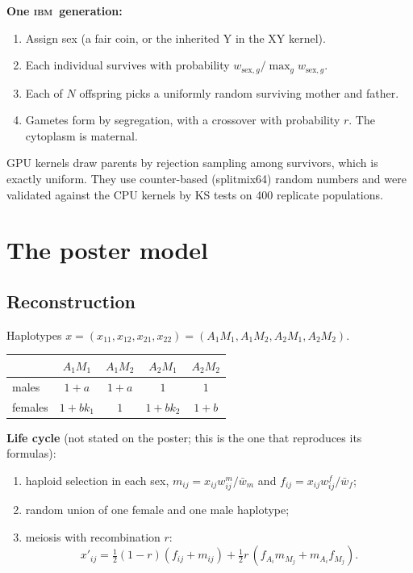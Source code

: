 \documentclass[11pt,a4paper]{article}
\newcommand{\IBM}{\textsc{ibm}}
\begin{document}
\noindent\textbf{One \IBM\ generation:}
\begin{enumerate}
\item Assign sex (a fair coin, or the inherited Y in the XY kernel).
\item Each individual survives with probability $w_{\text{sex},g}/\max_g w_{\text{sex},g}$.
\item Each of $N$ offspring picks a uniformly random surviving mother and father.
\item Gametes form by segregation, with a crossover with probability $r$. The cytoplasm is maternal.
\end{enumerate}
GPU kernels draw parents by rejection sampling among survivors, which is exactly uniform. They use counter-based (splitmix64) random numbers and were validated against the CPU kernels by KS tests on 400 replicate populations.

\section{The poster model}
\subsection{Reconstruction}
Haplotypes $x=(x_{11},x_{12},x_{21},x_{22})=(A_1M_1,A_1M_2,A_2M_1,A_2M_2)$.

\begin{center}\begin{tabular}{lcccc}\toprule
 & $A_1M_1$ & $A_1M_2$ & $A_2M_1$ & $A_2M_2$\\\midrule
males & $1+a$ & $1+a$ & $1$ & $1$\\
females & $1+bk_1$ & $1$ & $1+bk_2$ & $1+b$\\\bottomrule\end{tabular}\end{center}

\noindent\textbf{Life cycle} (not stated on the poster; this is the one that reproduces its formulas):
\begin{enumerate}
\item haploid selection in each sex, $m_{ij}=x_{ij}w^m_{ij}/\bar w_m$ and $f_{ij}=x_{ij}w^f_{ij}/\bar w_f$;
\item random union of one female and one male haplotype;
\item meiosis with recombination $r$:
\begin{equation}
x'_{ij}=\tfrac12(1-r)(f_{ij}+m_{ij})+\tfrac12 r\,(f_{A_i}m_{M_j}+m_{A_i}f_{M_j}).
\end{equation}
\end{enumerate}
\end{document}

